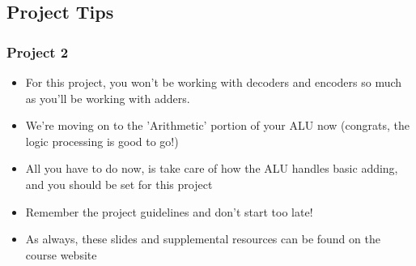 \documentclass{beamer}
\begin{document}
		\subsection{Project Tips}       	
       	
       	\begin{frame}
       		\frametitle{Project 2}
       		\begin{itemize}
       			\item For this project, you won't be working with decoders and encoders so much as you'll be working with adders.
       			\item We're moving on to the 'Arithmetic' portion of your ALU now (congrats, the logic processing is good to go!)
       			\item All you have to do now, is take care of how the ALU handles basic adding, and you should be set for this project
       			\item Remember the project guidelines and don't start too late!
       			\item As always, these slides and supplemental resources can be found on the course website
       		\end{itemize}
       	\end{frame}
		
		
    
    
\end{document}
